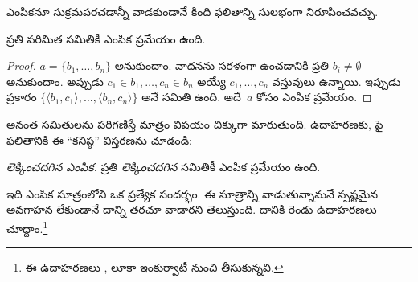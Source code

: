 \documentclass[../../../include/open-logic-section]{subfiles}
\begin{document}

ఎంపికనూ సుక్రమపరచడాన్నీ వాడకుండానే కింది ఫలితాన్ని సులభంగా నిరూపించవచ్చు.

\begin{lem}[$\Zminus$లో]
ప్రతి పరిమిత సమితికీ ఎంపిక ప్రమేయం ఉంది.
\end{lem}

\begin{proof}
$a = \{b_1, \ldots, b_n\}$ అనుకుందాం. వాదనను సరళంగా ఉంచడానికి ప్రతి $b_i
\neq \emptyset$ అనుకుందాం. అప్పుడు $c_1 \in b_1, \ldots, c_n \in b_n$ అయ్యే $c_1, \ldots, c_n$ వస్తువులు ఉన్నాయి. ఇప్పుడు  ప్రకారం $\{\langle b_1,
c_1\rangle , \ldots, \langle b_n, c_n\rangle\}$ అనే సమితి ఉంది. అదే~$a$ కోసం ఎంపిక ప్రమేయం.
\end{proof}

అనంత సమితులను పరిగణిస్తే మాత్రం విషయం చిక్కుగా మారుతుంది. ఉదాహరణకు, పై ఫలితానికి ఈ ``కనిష్ఠ'' విస్తరణను చూడండి:

\begin{defish}
\emph{లెక్కించదగిన ఎంపిక.} ప్రతి \emph{లెక్కించదగిన} సమితికీ ఎంపిక ప్రమేయం ఉంది.
\end{defish}

ఇది ఎంపిక సూత్రంలోని ఒక ప్రత్యేక సందర్భం. ఈ సూత్రాన్ని వాడుతున్నామనే
స్పష్టమైన అవగాహన లేకుండానే దాన్ని తరచూ వాడారని తెలుస్తుంది.
దానికి రెండు ఉదాహరణలు చూద్దాం.\footnote{ఈ ఉదాహరణలు
\citet[\S9.4]{Potter2004}, లూకా ఇంకుర్వాటీ నుంచి తీసుకున్నవి.}
\end{document}
